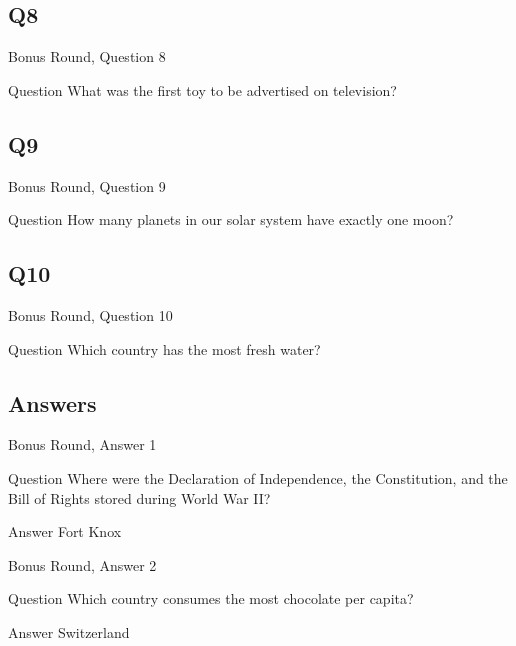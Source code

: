 \documentclass[11pt]{beamer}
\begin{document}
\subsection*{Q8}
\begin{frame}[t]{Bonus Round, Question 8}
\vspace{2em}
\begin{block}{Question}
What was the first toy to be advertised on television\@?
\end{block}
\end{frame}
    

\subsection*{Q9}
\begin{frame}[t]{Bonus Round, Question 9}
\vspace{2em}
\begin{block}{Question}
How many planets in our solar system have exactly one moon\@?
\end{block}
\end{frame}
    

\subsection*{Q10}
\begin{frame}[t]{Bonus Round, Question 10}
\vspace{2em}
\begin{block}{Question}
Which country has the most fresh water\@?
\end{block}
\end{frame}
    
\subsection{Answers}

\begin{frame}[t]{Bonus Round, Answer 1}
\vspace{2em}
\begin{block}{Question}
Where were the Declaration of Independence, the Constitution, and the Bill of Rights stored during World War II\@?
\end{block}
\pause{}
\begin{block}{Answer}
Fort Knox
\end{block}
\end{frame}
    

\begin{frame}[t]{Bonus Round, Answer 2}
\vspace{2em}
\begin{block}{Question}
Which country consumes the most chocolate per capita\@?
\end{block}
\pause{}
\begin{block}{Answer}
Switzerland
\end{block}
\end{frame}
    
\end{document}
